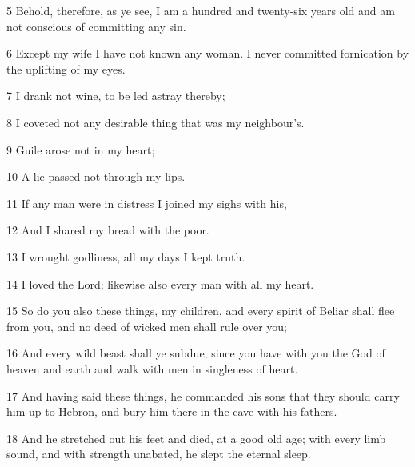 \par 5 Behold, therefore, as ye see, I am a hundred and twenty-six years old and am not conscious of committing any sin.

\par 6 Except my wife I have not known any woman. I never committed fornication by the uplifting of my eyes.

\par 7 I drank not wine, to be led astray thereby;

\par 8 I coveted not any desirable thing that was my neighbour's.

\par 9 Guile arose not in my heart;

\par 10 A lie passed not through my lips.

\par 11 If any man were in distress I joined my sighs with his,

\par 12 And I shared my bread with the poor.

\par 13 I wrought godliness, all my days I kept truth.

\par 14 I loved the Lord; likewise also every man with all my heart.

\par 15 So do you also these things, my children, and every spirit of Beliar shall flee from you, and no deed of wicked men shall rule over you;

\par 16 And every wild beast shall ye subdue, since you have with you the God of heaven and earth and walk with men in singleness of heart.

\par 17 And having said these things, he commanded his sons that they should carry him up to Hebron, and bury him there in the cave with his fathers.

\par 18 And he stretched out his feet and died, at a good old age; with every limb sound, and with strength unabated, he slept the eternal sleep.



